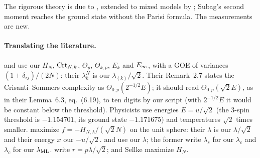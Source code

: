 \begin{refsection}
The rigorous theory is due to \textcite{AuffingerBenArousCerny2013}, extended to mixed models by \textcite{AuffingerBenArous2013}; Subag's second moment reaches the ground state without the Parisi formula. The measurements are new.

\paragraph{Translating the literature.} \Textcite{AuffingerBenArousCerny2013} and \textcite{Subag2017a} use our $H_N$, $\mathrm{Crt}_{N,k}$, $\Theta_p$, $\Theta_{k,p}$, $E_k$ and $E_\infty$, with a GOE of variances $(1+\delta_{ij})/(2N)$: their $\lambda_k^N$ is our $\lambda_{(k)}/\sqrt2$. Their Remark~2.7 states the Crisanti--Sommers complexity as $\Theta_{0,p}(2^{-1/2}E)$; it should read $\Theta_{0,p}(\sqrt2E)$, as in their Lemma~6.3, eq.~(6.19), to ten digits by our script (with $2^{-1/2}E$ it would be constant below the threshold). Physicists use energies $E=u/\sqrt2$ (the $3$-spin threshold is $-1.154701$, its ground state $-1.171675$) and temperatures $\sqrt2$ times smaller. \Textcite{BenArousMeiMontanariNica2019} maximize $f=-H_{N,\lambda}/(\sqrt2N)$ on the unit sphere: their $\lambda$ is our $\lambda/\sqrt2$ and their energy $x$ our $-u/\sqrt2$. \Textcite{JagannathLopattoMiolane2020} and \textcite{BenArousGheissariJagannath2020} use our $\lambda$; the former write $\lambda_s$ for our $\lambda_c$ and $\lambda_c$ for our $\lambda_{\mathrm{ML}}$. \Textcite{RosEtAl2019} write $r=p\lambda/\sqrt2$; \textcite{HuangSellke2025} and Sellke maximize $H_N$.

\printchapterbib
\end{refsection}
